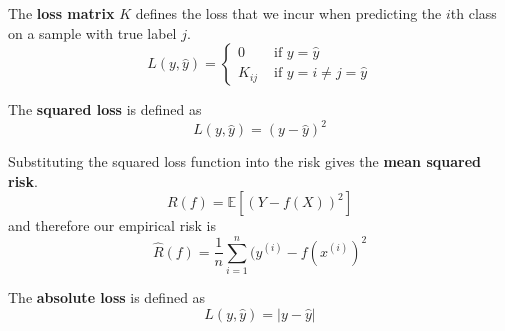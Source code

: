   \begin{definition}
    The \textbf{loss matrix} $K$ defines the loss that we incur when predicting the $i$th class on a sample with true label $j$. 
    \begin{equation}
      L(y, \hat{y}) = \begin{cases} 0 & \text{ if } y = \hat{y} \\ K_{ij} & \text{ if } y = i \neq j = \hat{y} \end{cases}
    \end{equation}
  \end{definition}

  \begin{definition}
    The \textbf{squared loss} is defined as 
    \begin{equation}
      L(y, \hat{y}) = (y - \hat{y})^2
    \end{equation}
  \end{definition}

  \begin{example}
    Substituting the squared loss function into the risk gives the \textbf{mean squared risk}. 
    \begin{equation}
      R(f) = \mathbb{E}[(Y - f(X))^2]
    \end{equation}
    and therefore our empirical risk is 
    \begin{equation}
      \hat{R} (f) = \frac{1}{n} \sum_{i=1}^n (y^{(i)} - f(x^{(i)})^2
    \end{equation}
  \end{example}

  \begin{definition}
    The \textbf{absolute loss} is defined as 
    \begin{equation}
      L(y, \hat{y}) = |y - \hat{y}|
    \end{equation}
  \end{definition}

